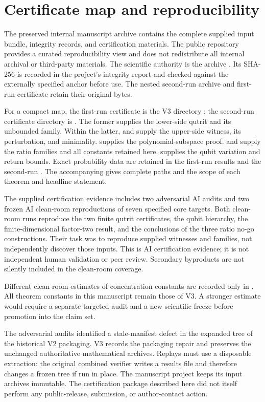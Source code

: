 \section{Certificate map and reproducibility}\label{app:reproducibility}
The preserved internal manuscript archive contains the complete supplied input bundle,
integrity records, and certification materials. The public repository provides a curated
reproducibility view and does not redistribute all internal archival or third-party materials. The scientific
authority is the archive
.
Its SHA-256 is recorded in the project's integrity report and checked
against the externally specified anchor before use. The nested second-run
archive and first-run certificate retain their original bytes.

For a compact map, the first-run certificate is the V3 directory
; the second-run certificate
directory is
.
The former supplies the lower-side qutrit and its unbounded family.
Within the latter,  and
 supply the upper-side witness,
its perturbation, and minimality. 
supplies the polynomial-subspace proof. 
and  supply the ratio families and all
constants retained here.  supplies
the qubit variation and return bounds. Exact probability data are retained
in the first-run results and the second-run
. The accompanying
 gives complete paths and the scope of
each theorem and headline statement.

The supplied certification evidence includes two adversarial AI audits and
two frozen AI clean-room reproductions of seven specified core targets.
Both clean-room runs reproduce the two finite qutrit certificates,
the qubit hierarchy, the finite-dimensional factor-two result, and
the conclusions of the three ratio no-go constructions. Their task was
to reproduce supplied witnesses and families, not independently discover
those inputs. This is AI certification evidence; it is not independent
human validation or peer review. Secondary byproducts are not silently
included in the clean-room coverage.

Different clean-room estimates of concentration constants are recorded
only in . All theorem
constants in this manuscript remain those of V3. A stronger estimate would
require a separate targeted audit and a new scientific freeze before
promotion into the claim set.

The adversarial audits identified a stale-manifest defect in the expanded
tree of the historical V2 packaging. V3 records the packaging repair and
preserves the unchanged authoritative mathematical archives. Replays must
use a disposable extraction: the original combined verifier writes a
results file and therefore changes a frozen tree if run in place.
The manuscript project keeps its input archives immutable. The certification package described here did not itself
perform any public-release, submission, or author-contact
action.

